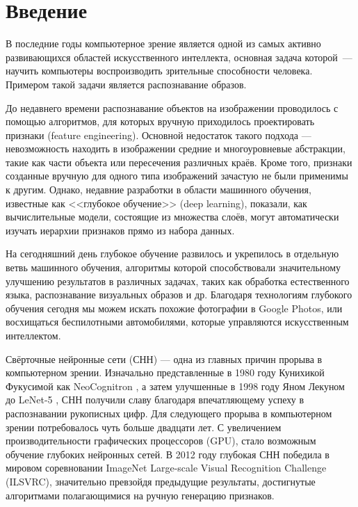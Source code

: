 \section{Введение}
В последние годы компьютерное зрение является одной из самых активно развивающихся областей 
искусственного интеллекта, основная задача которой~--- научить компьютеры воспроизводить 
зрительные способности человека. Примером такой задачи является распознавание образов.

До недавнего времени распознавание объектов на изображении проводилось с помощью алгоритмов, 
для которых вручную приходилось проектировать признаки (feature engineering). 
Основной недостаток такого подхода --- невозможность находить в изображении 
средние и многоуровневые абстракции, такие как части объекта или пересечения различных краёв. 
Кроме того, признаки созданные вручную для одного типа изображений зачастую не были применимы к 
другим. Однако, недавние разработки в области машинного обучения, известные как <<глубокое 
обучение>> (deep learning), показали, как вычислительные модели, состоящие из множества слоёв, 
могут автоматически изучать иерархии признаков прямо из набора данных.

На сегодняшний день глубокое обучение развилось и укрепилось в отдельную ветвь машинного обучения, 
алгоритмы которой способствовали значительному улучшению результатов в различных задачах, таких как 
обработка естественного языка, распознавание визуальных образов и др. Благодаря технологиям 
глубокого обучения сегодня мы можем искать похожие фотографии в Google Photos, или восхищаться 
беспилотными автомобилями, которые управляются искусственным интеллектом.

Свёрточные нейронные сети (СНН) --- одна из главных причин прорыва в компьютерном зрении. 
Изначально представленные в 1980 году Кунихикой Фукусимой как NeoCognitron \cite{Neocognitron}, а 
затем улучшенные в 1998 году Яном Лекуном до LeNet-5 \cite{lecun-98}, СНН получили славу благодаря 
впечатляющему успеху в  распознавании рукописных цифр. Для следующего прорыва в компьютерном зрении 
потребовалось чуть больше двадцати лет. С увеличением производительности графических процессоров 
(GPU), стало возможным обучение глубоких нейронных сетей. В 2012 году глубокая СНН победила в 
мировом соревновании ImageNet Large-scale Visual Recognition Challenge (ILSVRC), значительно 
превзойдя предыдущие результаты, достигнутые алгоритмами полагающимися на ручную генерацию 
признаков.